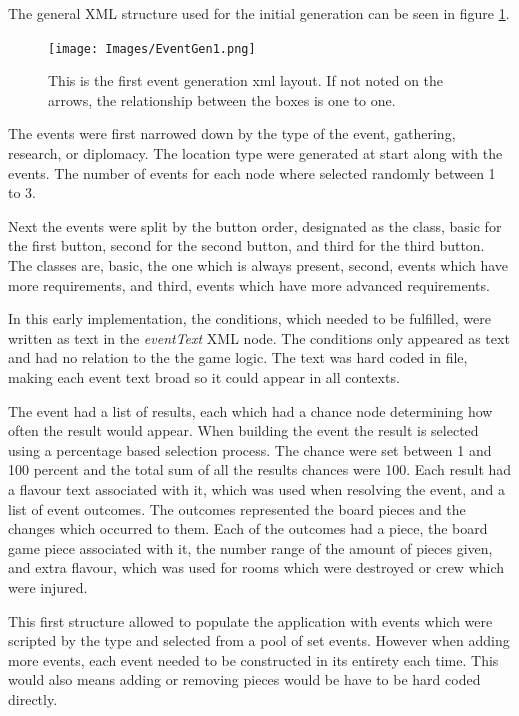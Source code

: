 The general XML structure used for the initial generation can be seen in figure \ref{fig:eGen1}.

\begin{figure}[h]
    \centering
    \texttt{[image: Images/EventGen1.png]}
    \caption{This is the first event generation xml layout. If not noted on the arrows, the relationship between the boxes is one to one.}
    \label{fig:eGen1}
\end{figure}

The events were first narrowed down by the type of the event, gathering, research, or diplomacy. The location type were generated at start along with the events. The number of events for each node where selected randomly between 1 to 3.

Next the events were split by the button order, designated as the class, basic for the first button, second for the second button, and third for the third button. 
The classes are, basic, the one which is always present, second, events which have more requirements, and third, events which have more advanced requirements. 

In this early implementation, the conditions, which needed to be fulfilled, were written as text in the \textit{eventText} XML node. The conditions only appeared as text and had no relation to the the game logic. The text was hard coded in file, making each event text broad so it could appear in all contexts.

The event had a list of results, each which had a chance node determining how often the result would appear. When building the event the result is selected using a percentage based selection process. The chance were set between 1 and 100 percent and the total sum of all the results chances were 100. 
Each result had a flavour text associated with it, which was used when resolving the event, and a list of event outcomes. 
The outcomes represented the board pieces and the changes which occurred to them. Each of the outcomes had a piece, the board game piece associated with it, the number range of the amount of pieces given, and extra flavour, which was used for rooms which were destroyed or crew which were injured.

This first structure allowed to populate the application with events which were scripted by the type and selected from a pool of set events. 
However when adding more events, each event needed to be constructed in its entirety each time. This would also means adding or removing pieces would be have to be hard coded directly. 

